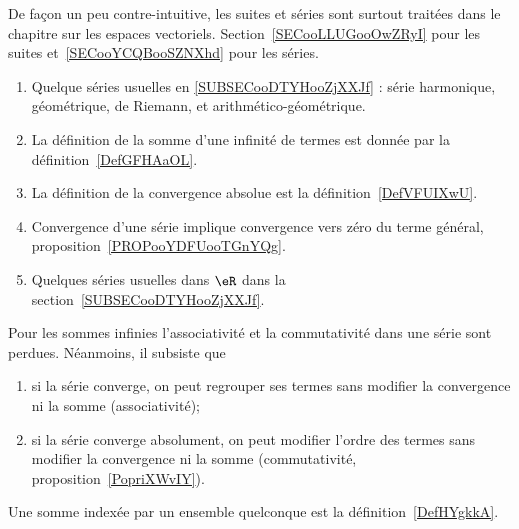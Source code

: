 
De façon un peu contre-intuitive, les suites et séries sont surtout traitées dans le chapitre sur les espaces vectoriels. Section~\ref{SECooLLUGooOwZRyI} pour les suites et~\ref{SECooYCQBooSZNXhd} pour les séries.

\begin{enumerate}
    \item
        Quelque séries usuelles en \ref{SUBSECooDTYHooZjXXJf} : série harmonique, géométrique, de Riemann, et arithmético-géométrique.
    \item
        La définition de la somme d'une infinité de termes est donnée par la définition~\ref{DefGFHAaOL}.
    \item
        La définition de la convergence absolue est la définition~\ref{DefVFUIXwU}.
    \item
        Convergence d'une série implique convergence vers zéro du terme général, proposition~\ref{PROPooYDFUooTGnYQg}.
    \item
        Quelques séries usuelles dans \( \eR\) dans la section~\ref{SUBSECooDTYHooZjXXJf}.
\end{enumerate}

    Pour les sommes infinies l'associativité et la commutativité dans une série sont perdues. Néanmoins, il subsiste que
  \begin{enumerate}
  \item
      si la série converge, on peut regrouper ses termes sans modifier la convergence ni la somme (associativité);
  \item
      si la série converge absolument, on peut modifier l'ordre des termes sans modifier la convergence ni la somme (commutativité, proposition~\ref{PopriXWvIY}).
  \end{enumerate}

Une somme indexée par un ensemble quelconque est la définition~\ref{DefHYgkkA}.

